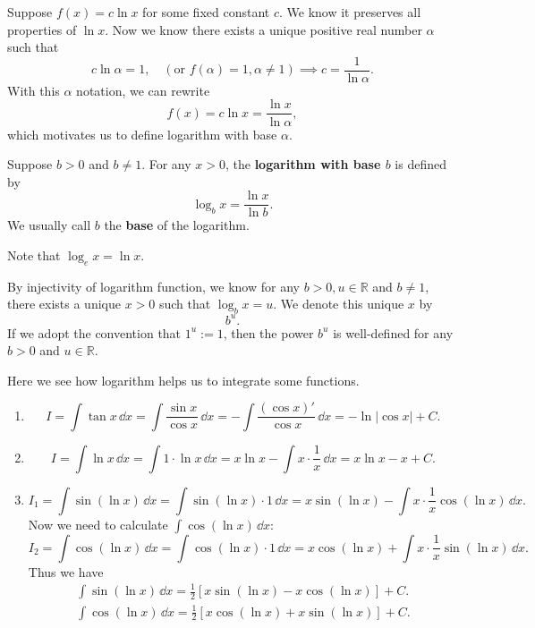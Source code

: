 	\begin{remarkenv}
		Suppose $f(x)=c \ln x$ for some fixed constant $c$. We know it preserves all properties of $\ln x$. Now we know there exists a unique positive real number $\alpha$ such that
		\[
		c \ln \alpha = 1,\quad (\text{or }f(\alpha)=1,\alpha \neq 1) \implies c = \frac{1}{\ln \alpha}.
		\]
		With this $\alpha$ notation, we can rewrite
		\[
		f(x) = c \ln x = \frac{\ln x}{\ln \alpha},
		\]
		which motivates us to define logarithm with base $\alpha$.
	\end{remarkenv}
	\begin{definitionenv}
		Suppose $b>0$ and $b\neq 1$. For any $x>0$, the \textbf{logarithm with base $b$} is defined by
		\[
		\log_b x = \frac{\ln x}{\ln b}.
		\]
		We usually call $b$ the \textbf{base} of the logarithm.
	\end{definitionenv}
	\begin{remarkenv}
		Note that $\log_e x = \ln x$.
	\end{remarkenv}
	\begin{remarkenv}
		By injectivity of logarithm function, we know for any $b>0, u\in \mathbb{R}$ and $b\neq 1$, there exists a unique $x>0$ such that $\log_b x = u$. We denote this unique $x$ by
		\[
		b^u.
		\]
		If we adopt the convention that $1^u := 1$, then the power $b^u$ is well-defined for any $b>0$ and $u\in \mathbb{R}$.
	\end{remarkenv}
	\begin{exampleenv}
		Here we see how logarithm helps us to integrate some functions.
		\begin{enumerate}
			\item \[
			I = \int \tan x\, \dd x = \int \frac{\sin x}{\cos x}\, \dd x = -\int \frac{(\cos x)'}{\cos x} \, \dd x = -\ln |\cos x| + C.
			\]
			\item \[
			I = \int \ln x \, \dd x = \int 1 \cdot \ln x\, \dd x = x \ln x - \int x \cdot \frac{1}{x}\, \dd x = x \ln x - x + C.
			\]
			\item \[
			I_1 = \int \sin(\ln x)\, \dd x = \int \sin(\ln x) \cdot 1\, \dd x = x \sin(\ln x) - \int x \cdot \frac{1}{x} \cos(\ln x)\, \dd x.
			\]
			Now we need to calculate $\int \cos(\ln x)\, \dd x$:
			\[
			I_2 = \int \cos(\ln x)\, \dd x = \int \cos(\ln x) \cdot 1\, \dd x = x \cos(\ln x) + \int x \cdot \frac{1}{x} \sin(\ln x)\, \dd x.
			\]
			Thus we have
			\[
			\begin{aligned}
				\int \sin(\ln x)\, \dd x = \frac12 \left[ x \sin(\ln x) - x \cos(\ln x) \right] + C.\\
				\int \cos(\ln x)\, \dd x = \frac12 \left[ x \cos(\ln x) + x \sin(\ln x) \right] + C.
			\end{aligned}
			\]
		\end{enumerate}
	\end{exampleenv}
